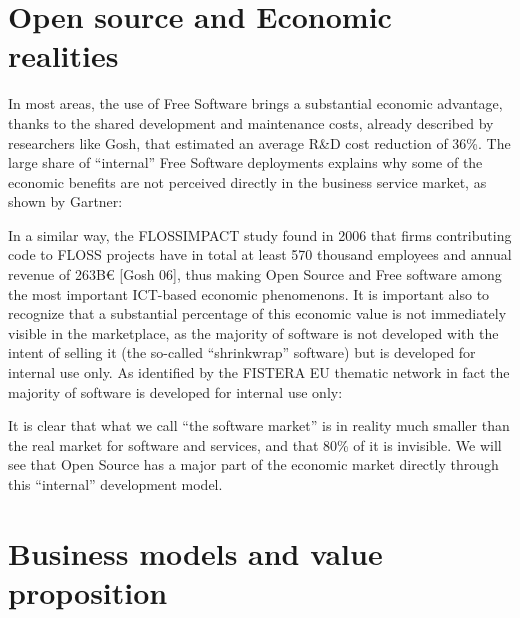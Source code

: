 \section*{Open source and Economic realities}

In most areas, the use of Free Software brings a substantial economic advantage,
thanks to the shared development and maintenance costs, already described by
researchers like Gosh, that estimated an average R\&D cost reduction of 36\%.
The large share of “internal” Free Software deployments explains why some of the
economic benefits are not perceived directly in the business service market, as
shown by Gartner:

In a similar way, the FLOSSIMPACT study found in 2006 that firms contributing
code to FLOSS projects have in total at least 570 thousand employees and annual
revenue of 263B€ [Gosh 06], thus making Open Source and Free software among the
most important ICT-based economic phenomenons. It is important also to recognize
that a substantial percentage of this economic value is not immediately visible
in the marketplace, as the majority of software is not developed with the intent
of selling it (the so-called “shrinkwrap” software) but is developed for
internal use only. As identified by the FISTERA EU thematic network in fact the
majority of software is developed for internal use only:

It is clear that what we call “the software market” is in reality much smaller
than the real market for software and services, and that 80\% of it is
invisible. We will see that Open Source has a major part of the economic market
directly through this “internal” development model.

\section*{Business models and value proposition}

